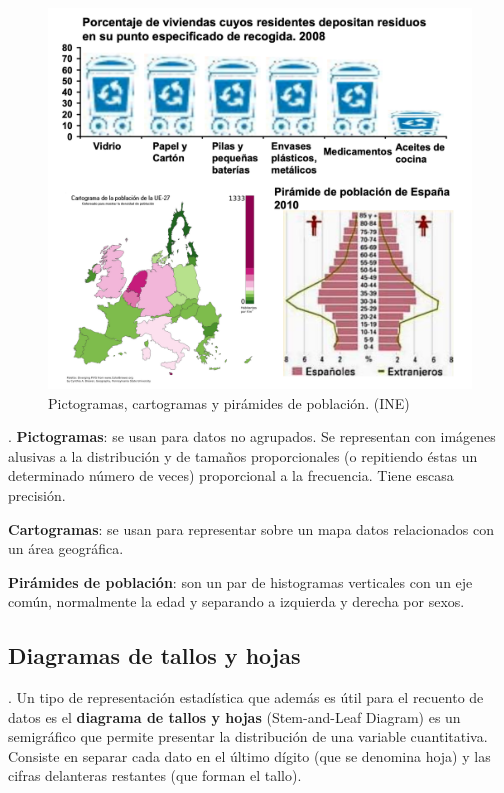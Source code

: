 	\begin{figure}[H]
			\centering
			\includegraphics[width=.9\textwidth]{imagenes/imagenes01/T01IM08.png}
			\caption*{\footnotesize{Pictogramas, cartogramas y pirámides de población. (INE)}}
		\end{figure}

\begin{definition}
	. \textbf{Pictogramas}: se usan para datos no agrupados. Se representan con imágenes alusivas a la distribución y de tamaños proporcionales	(o repitiendo éstas un determinado número de veces) proporcional a la frecuencia. Tiene escasa precisión.
	
	\vspace{4mm} \textbf{Cartogramas}: se usan para representar sobre un mapa datos relacionados con un área geográfica.
	
	\vspace{4mm} \textbf{Pirámides de población}: son un par de histogramas verticales con un eje común, normalmente la edad y separando a izquierda y derecha por sexos.
	
\end{definition}



\subsection{Diagramas de tallos y hojas}

\begin{definition}
	. Un tipo de representación estadística que además es útil para el recuento de datos es el \textbf{diagrama de tallos y hojas} (Stem-and-Leaf Diagram) es un semigráfico que permite presentar la distribución de una variable cuantitativa. Consiste en separar cada dato en el último dígito (que se denomina hoja) y las cifras delanteras restantes (que forman el tallo).
\end{definition}


